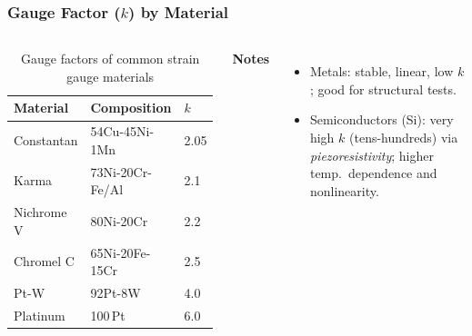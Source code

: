 \begin{frame}
	\frametitle{Gauge Factor ($k$) by Material}
    \begin{columns}[T,onlytextwidth]
            \begin{table}
                \centering
                \begin{tabular}{@{}lll@{}}
                    \toprule
                    \textbf{Material} & \textbf{Composition} & \textbf{$k$} \\
                    \midrule
                    Constantan & 54Cu-45Ni-1Mn   & 2.05 \\
                    Karma      & 73Ni-20Cr-Fe/Al & 2.1 \\
                    Nichrome V & 80Ni-20Cr       & 2.2 \\
                    Chromel C  & 65Ni-20Fe-15Cr  & 2.5 \\
                    Pt-W       & 92Pt-8W         & 4.0 \\
                    Platinum   & 100\,Pt         & 6.0 \\
                    \bottomrule
                \end{tabular}
                \caption{Gauge factors of common strain gauge materials}\label{tab:gauge_factor_materials}
            \end{table}
            \textbf{Notes}
            \begin{itemize}
                \item Metals: stable, linear, low $k$; good for structural tests.
                \item Semiconductors (Si): very high $k$ (tens-hundreds) via \emph{piezoresistivity}; higher temp.\ dependence and nonlinearity.
            \end{itemize}
    \end{columns}
\end{frame}

